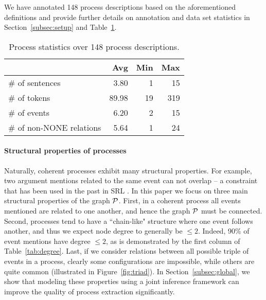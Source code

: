 We have annotated 148 process descriptions based on the aforementioned definitions and provide further details on annotation and data set statistics in Section~\ref{subsec:setup} and Table~\ref{tab:datastats}.

\begin{table}[t]
{\footnotesize
\hfill{}
\begin{tabular}{|l|r|r|r|}
\hline
&\textbf{Avg}&\textbf{Min} & \textbf{Max}\\
\hline
\# of sentences            &     3.80       &    1        &   15 \\ 
\# of tokens            &     89.98        &   19        & 319  \\ 
\# of events                &   6.20         &       2   &  15  \\ 
\# of non-\textsc{NONE} relations          &     5.64       &      1        &  24 \\ 
\hline
\end{tabular}}
\hfill{}
\caption{Process statistics over 148 process descriptions.}
\label{tab:datastats}
\end{table}

\paragraph{Structural properties of processes} 
Naturally, coherent processes exhibit many structural properties. For example, two argument mentions related to the same event can not overlap -- a constraint that has been used in the past in SRL \cite{Toutanova08}. In this paper we focus on three main structural properties of the graph $\mathcal{P}$. First, in a coherent process all events mentioned are related to one another, and hence the graph $\mathcal{P}$ must be connected. Second, processes tend to have a ``chain-like" structure where one event follows another, and thus we expect node degree to generally be $\leq 2$. Indeed, 90\% of event mentions have degree $\leq2$, as is demonstrated by the first column of Table~\ref{tab:degree}. Last, if we consider relations between all possible triple of events in a process, clearly some configurations are impossible, while others are quite common (illustrated in Figure~\ref{fig:triad}). In Section~\ref{subsec:global}, we show that modeling these properties using a joint inference framework can improve the quality of process extraction significantly.


